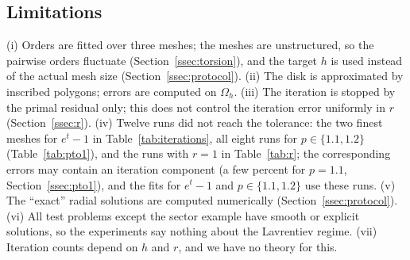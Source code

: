 \documentclass[11pt]{amsart}
\theoremstyle{definition}
\theoremstyle{remark}
\numberwithin{equation}{section}
\begin{document}
\subsection{Limitations}\label{ssec:limitations}
(i) Orders are fitted over three meshes; the meshes are unstructured, so the pairwise orders fluctuate (Section~\ref{ssec:torsion}), and the target $h$ is used instead of the actual mesh size (Section~\ref{ssec:protocol}). (ii) The disk is approximated by inscribed polygons; errors are computed on $\Omega_h$. (iii) The iteration is stopped by the primal residual only; this does not control the iteration error uniformly in $r$ (Section~\ref{ssec:r}). (iv) Twelve runs did not reach the tolerance: the two finest meshes for $e^t-1$ in Table~\ref{tab:iterations}, all eight runs for $p\in\{1.1,1.2\}$ (Table~\ref{tab:pto1}), and the runs with $r=1$ in Table~\ref{tab:r}; the corresponding errors may contain an iteration component (a few percent for $p=1.1$, Section~\ref{ssec:pto1}), and the fits for $e^t-1$ and $p\in\{1.1,1.2\}$ use these runs. (v) The ``exact'' radial solutions are computed numerically (Section~\ref{ssec:protocol}). (vi) All test problems except the sector example have smooth or explicit solutions, so the experiments say nothing about the Lavrentiev regime. (vii) Iteration counts depend on $h$ and $r$, and we have no theory for this.

\end{document}
